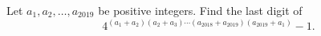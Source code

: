 Let $a_1,a_2,\dots,a_{2019}$ be positive integers. Find the last digit of
\[
4^{(a_1+a_2)(a_2+a_3)\cdots(a_{2018}+a_{2019})(a_{2019}+a_1)}-1 .
\]
